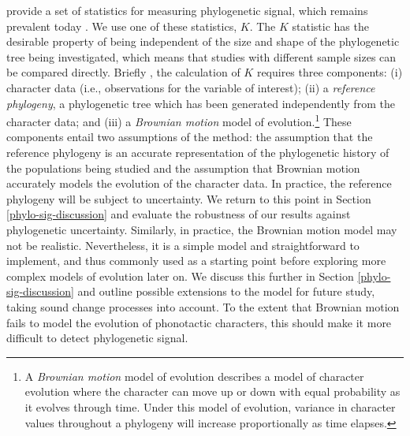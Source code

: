 \textcite{blomberg_testing_2003} provide a set of statistics for measuring phylogenetic signal, which remains prevalent today \autocites[for example,][]{balisi_dietary_2018}{hutchinson_contemporary_2018}{leff_predicting_2018}. We use one of these statistics, \(K\). The \(K\) statistic has the desirable property of being independent of the size and shape of the phylogenetic tree being investigated, which means that studies with different sample sizes can be compared directly. Briefly \autocite[following][p.~722]{blomberg_testing_2003}, the calculation of \(K\) requires three components: (i) character data (i.e., observations for the variable of interest); (ii) a \emph{reference phylogeny}, a phylogenetic tree which has been generated independently from the character data; and (iii) a \emph{Brownian motion} model of evolution.\footnote{A \emph{Brownian motion} model of evolution describes a model of character evolution where the character can move up or down with equal probability as it evolves through time. Under this model of evolution, variance in character values throughout a phylogeny will increase proportionally as time elapses.} These components entail two assumptions of the method: the assumption that the reference phylogeny is an accurate representation of the phylogenetic history of the populations being studied and the assumption that Brownian motion accurately models the evolution of the character data. In practice, the reference phylogeny will be subject to uncertainty. We return to this point in Section \ref{phylo-sig-discussion} and evaluate the robustness of our results against phylogenetic uncertainty. Similarly, in practice, the Brownian motion model may not be realistic. Nevertheless, it is a simple model and straightforward to implement, and thus commonly used as a starting point before exploring more complex models of evolution later on. We discuss this further in Section \ref{phylo-sig-discussion} and outline possible extensions to the model for future study, taking sound change processes into account. To the extent that Brownian motion fails to model the evolution of phonotactic characters, this should make it more difficult to detect phylogenetic signal.

